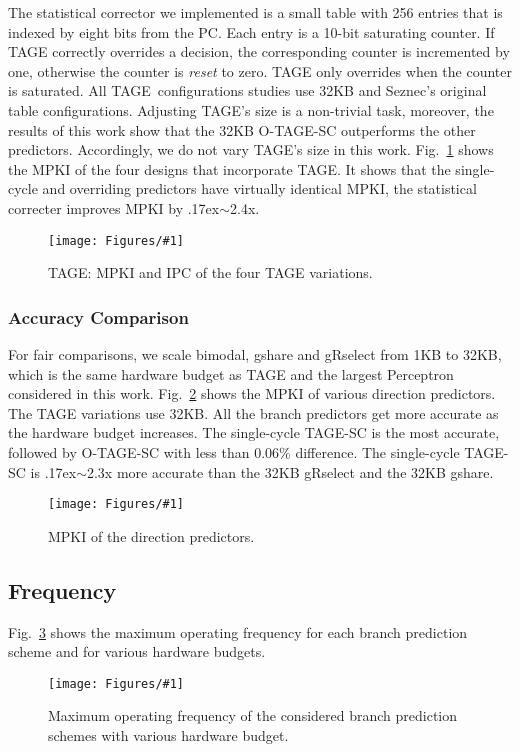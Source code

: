 \documentclass[conference]{IEEEtran}
\newcommand{\mytilde}{{\raise.17ex\hbox{$\scriptstyle\sim$}}}
\newcommand{\kfig}[4]{ %
        \begin{figure}[!t]
        \centering
        \texttt{[image: Figures/\#1]}
        \vspace{-1mm}
        \caption{#3}
        \label{#2}
        \end{figure}
}
\begin{document}
The statistical corrector we implemented is a small table with 256 entries that is indexed by eight bits from the PC. Each entry is a 10-bit saturating counter. If TAGE correctly overrides a decision, the corresponding counter is incremented by one, otherwise the counter is \textit{reset} to zero. TAGE only overrides when the counter is saturated.
All TAGE\ configurations studies use 32KB and Seznec's original table configurations. Adjusting TAGE's size is a non-trivial task, moreover, the results of this work show that the 32KB \mbox{O-TAGE-SC} outperforms the other predictors. Accordingly, we do not vary TAGE's size in this work. Fig.~\ref{fig:tageMPKI} shows the MPKI of the four designs that incorporate TAGE. It shows that the single-cycle and overriding predictors have virtually identical MPKI, the statistical correcter improves MPKI by \mytilde 2.4x.
\kfig{tageMPKI.pdf}{fig:tageMPKI}{TAGE: MPKI and IPC of the four TAGE variations.}{angle = 0, trim = 0.7in 2.6in 1in 2.7in, clip, width=0.35\textwidth}



\subsubsection{Accuracy Comparison}
\label{sec:eval:accuracy:comparison}
For fair comparisons, we scale bimodal, gshare and gRselect from 1KB to 32KB, which is the same hardware budget as TAGE and the largest Perceptron considered in this work. Fig.~\ref{fig:admpki} shows the MPKI of various direction predictors. The TAGE variations use 32KB. All the branch predictors get more accurate as the hardware budget increases. The single-cycle \mbox{TAGE-SC} is the most accurate, followed by \mbox{O-TAGE-SC} with less than 0.06\% difference. The single-cycle \mbox{TAGE-SC} is \mytilde 2.3x more accurate than the 32KB gRselect and the 32KB gshare.
\kfig{admpki.pdf}{fig:admpki}{MPKI of the direction predictors.}{angle = 0, trim = 0.9in 2.7in 0.8in 2.7in, clip, width=0.5\textwidth}

\subsection{Frequency}
\label{sec:eval:fmax}
Fig.~\ref{fig:adfmax} shows the maximum operating frequency for each branch prediction scheme and for various hardware budgets.
\kfig{adfmax.pdf}{fig:adfmax}{Maximum operating frequency of the considered branch prediction schemes with various hardware budget.}{angle = 0, trim = 0.8in 4.6in 0.7in 5.2in, clip, width=0.5\textwidth}
\end{document}
